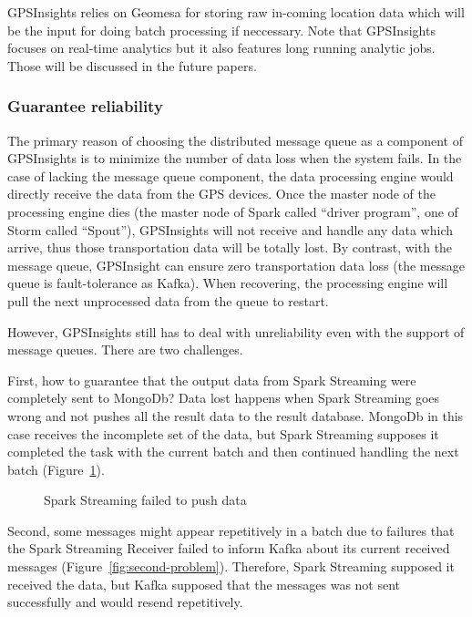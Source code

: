 \documentclass{acm_proc_article-sp}
\begin{document}
GPSInsights relies on Geomesa for storing raw in-coming location data which will be the input for doing batch processing if neccessary. Note that GPSInsights focuses on real-time analytics but it also features long running analytic jobs. Those will be discussed in the future papers. 

\subsubsection{Guarantee reliability}

The primary reason of choosing the distributed message queue as a component of GPSInsights is to minimize the number of data loss when the system fails. In the case of lacking the message queue component, the data processing engine would directly receive the data from the GPS devices. Once the master node of the processing engine dies (the master node of Spark called ``driver program'', one of Storm called ``Spout''), GPSInsights will not receive and handle any data which arrive, thus those transportation data will be totally lost. By contrast, with the message queue, GPSInsight can ensure zero transportation data loss (the message queue is fault-tolerance as Kafka). When recovering, the processing engine will pull the next unprocessed data from the queue to restart.

However, GPSInsights still has to deal with unreliability even with the support of message queues. There are two challenges. 

First, how to guarantee that the output data from Spark Streaming were completely sent to MongoDb? Data lost happens when Spark Streaming goes wrong and not pushes all the result data to the result database. MongoDb in this case receives the incomplete set of the data, but Spark Streaming supposes it completed the task with the current batch and then continued handling the next batch (Figure~\ref{fig:first-problem}).

\begin{figure}[h]
\centering
{}
\caption{Spark Streaming failed to push data}
\label{fig:first-problem}
\end{figure} 

Second, some messages might appear repetitively in a batch due to failures that the Spark Streaming Receiver failed to inform Kafka about its current received messages (Figure~\ref{fig:second-problem}). Therefore, Spark Streaming supposed it received the data, but Kafka supposed that the messages was not sent successfully and would resend repetitively. 
 
\end{document}
